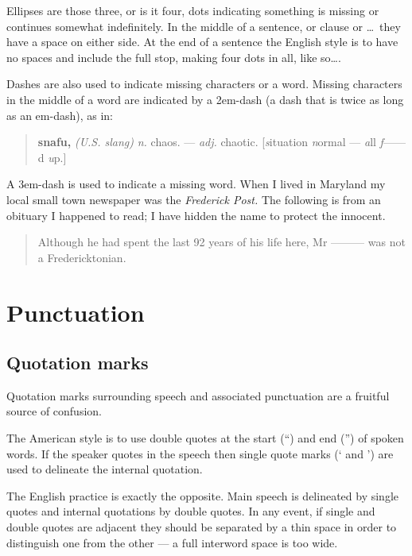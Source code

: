 \documentclass[10pt,letterpaper,extrafontsizes]{memoir}
\begin{document}
    Ellipses are those three, or is it four, 
dots indicating something is
missing or continues somewhat indefinitely. In the middle of a sentence,
or clause or \ldots\ they have a space on either side. At the end of
a sentence the English style is to have no spaces and include the full
stop, making four dots in all, like so\ldots.

   Dashes are also used to indicate missing characters or a word. Missing
characters in the middle of a word are indicated by a 
2em-dash (a dash that
is twice as long as an em-dash), as in:
\begin{quote}
\textbf{snafu,} \textit{(U.S. slang)} \textit{n.} chaos. --- \textit{adj.}
  chaotic. [\textit{s}ituation \textit{n}ormal --- \textit{a}ll
  \textit{f}------d \textit{u}p.]
\end{quote}
A 3em-dash is used to indicate a 
missing word. When I lived in Maryland my
local small town newspaper was the \textit{Frederick Post.} 
The following is from an 
obituary I happened to read; I have hidden the name to protect the 
innocent.
\begin{quote}
  Although he had spent the last 92 years of his life here, 
Mr --------- was not a Fredericktonian.
\end{quote}


\section{Punctuation}

\subsection{Quotation marks}

    Quotation marks surrounding speech and associated punctuation 
are a fruitful source of confusion.

    The American style is to use double quotes at the start (``) and 
end ('') of spoken words. If the speaker quotes in the speech then single
quote marks (` and ') are used to delineate the internal quotation.

    The English practice is exactly the opposite. Main speech is delineated
by single quotes and internal quotations by double quotes. 
In any event,
if single and double quotes are adjacent they should be separated by a thin
space in order to distinguish one from the other --- 
a full interword space is too wide.
\end{document}
